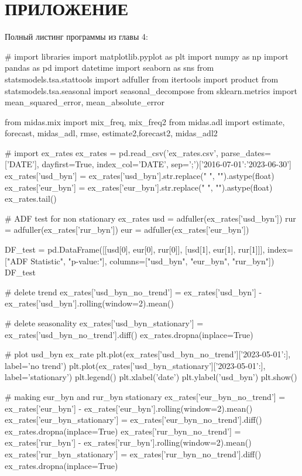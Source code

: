 \documentclass[a4paper, 12pt]{extarticle}
\begin{document}
	\section{ПРИЛОЖЕНИЕ}
	Полный листинг программы из главы 4:
	\begin{python}
		# import libraries
	import matplotlib.pyplot as plt
	import numpy as np
	import pandas as pd
	import datetime
	import seaborn as sns
	from statsmodels.tsa.stattools import adfuller
	from itertools import product
	from statsmodels.tsa.seasonal import seasonal_decompose
	from sklearn.metrics import mean_squared_error, mean_absolute_error
	
	
	from midas.mix import mix_freq, mix_freq2
	from midas.adl import estimate, forecast, midas_adl, rmse, estimate2,forecast2, midas_adl2
		
		# import ex_rates
		ex_rates = pd.read_csv('ex_rates.csv', parse_dates=['DATE'], dayfirst=True, index_col='DATE', sep=';')['2016-07-01':'2023-06-30']
		ex_rates['usd_byn'] = ex_rates['usd_byn'].str.replace(" ", "").astype(float)
		ex_rates['eur_byn'] = ex_rates['eur_byn'].str.replace(" ", "").astype(float)
		ex_rates.tail()
		
		# ADF test for non stationary ex_rates
		usd = adfuller(ex_rates['usd_byn'])
		rur = adfuller(ex_rates['rur_byn'])
		eur = adfuller(ex_rates['eur_byn'])
		
		DF_test = pd.DataFrame([[usd[0], eur[0], rur[0]], [usd[1], eur[1], rur[1]]], index=["ADF Statistic", "p-value:"], columns=["usd_byn", "eur_byn", "rur_byn"])
		DF_test
		
		# delete trend
		ex_rates['usd_byn_no_trend'] = ex_rates['usd_byn'] - ex_rates['usd_byn'].rolling(window=2).mean()
		
		# delete seasonality
		ex_rates['usd_byn_stationary'] = ex_rates['usd_byn_no_trend'].diff()
		ex_rates.dropna(inplace=True)
		
		# plot usd_byn ex_rate
		plt.plot(ex_rates['usd_byn_no_trend']['2023-05-01':], label='no trend')
		plt.plot(ex_rates['usd_byn_stationary']['2023-05-01':], label='stationary')
		plt.legend()
		plt.xlabel('date')
		plt.ylabel('usd_byn')
		plt.show()
		
	# making eur_byn and rur_byn stationary
	ex_rates['eur_byn_no_trend'] = ex_rates['eur_byn'] - ex_rates['eur_byn'].rolling(window=2).mean()
	ex_rates['eur_byn_stationary'] = ex_rates['eur_byn_no_trend'].diff()
	ex_rates.dropna(inplace=True)
	ex_rates['rur_byn_no_trend'] = ex_rates['rur_byn'] - ex_rates['rur_byn'].rolling(window=2).mean()
	ex_rates['rur_byn_stationary'] = ex_rates['rur_byn_no_trend'].diff()
	ex_rates.dropna(inplace=True)
	

\end{python}
\end{document}
